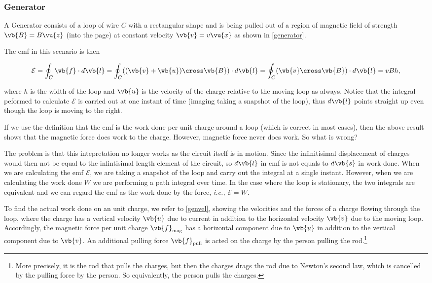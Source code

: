 \documentclass[english,a4paper,12pt]{report}
\begin{document}

\subsubsection{Generator}

A Generator consists of a loop of wire \(C\) with a rectangular shape and is being pulled out of a region of magnetic field of strength \(\vb{B} = B \vu{z}  \) (into the page) at constant velocity \(\vb{v} = v \vu{x} \)  as shown in \cref{generator}.


The emf in this scenario is then 

\begin{equation}
    \mathcal{E} = \oint_{C} \vb{f}  \cdot d \vb{l} = \oint_{C} ((\vb{v} + \vb{u}) \cross \vb{B} ) \cdot  d\vb{l}  = \oint_{C}(\vb{v} \cross \vb{B} )\cdot d \vb{l} =  vBh ,
\end{equation}

where \(h\) is the width of the loop and \(\vb{u}\) is the velocity of the charge relative to the moving loop as always. Notice that the integral peformed to calculate \(\mathcal{E}\) is carried out at one instant of time (imaging taking a snapshot of the loop), thus \(d \vb{l} \) points straight up even though the loop is moving to the right.  

If we use the definition that the emf is the work done per unit charge around a loop (which is correct in most cases), then the above result shows that the magnetic force does work to the charge. However, magnetic force never does work. So what is wrong?

The problem is that this intepretation no longer works as the circuit itself is in motion. Since the infinitisimal displacement of charges would then not be equal to the infintisimal length element of the circuit, so \(d \vb{l} \) in emf is not equals to \(d \vb{s} \) in work done. When we are calculating the emf \(\mathcal{E}\), we are taking a snapshot of the loop and carry out the integral at a single instant. However, when we are calculating the work done \(W\) we are performing a path integral over time. In the case where the loop is stationary, the two integrals are equivalent and we can regard the emf as the work done by the force, \textit{i.e.,} \(\mathcal{E}= W\). 

To find the actual work done on an unit charge, we refer to \cref{genvel}, showing the velocities and the forces of a charge flowing through the loop, where the charge has a vertical velocity \(\vb{u}\) due to current in addition to the horizontal velocity \(\vb{v} \) due to the moving loop. Accordingly, the magnetic force per unit charge \(\vb{f} _{\text{mag} } \) has a horizontal component due to \(\vb{u}\) in addition to the vertical component due to \(\vb{v} \). An additional pulling force \(\vb{f} _{\text{pull} } \) is acted on the charge by the person pulling the rod.\footnote{More precisely, it is the rod that pulls the charges, but then the charges drags the rod due to Newton's second law, which is cancelled by the pulling force by the person. So equivalently, the person pulls the charges.}   
\end{document}
